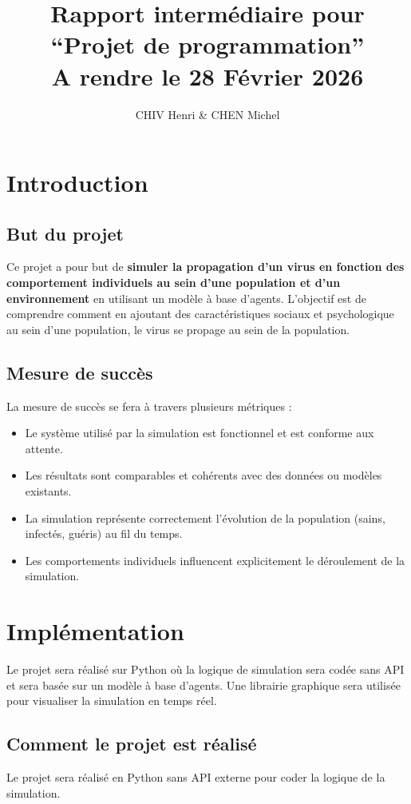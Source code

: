 \documentclass{article}
\title{%
  Rapport intermédiaire pour ``Projet de programmation''\\
  A rendre le 28 Février 2026%
}
\author{CHIV Henri \& CHEN Michel}
\begin{document}
\maketitle

\section{Introduction}

\subsection{But du projet}
Ce projet a pour but de \textbf{simuler la propagation d'un virus en fonction des comportement individuels au sein d'une population et d'un environnement} en utilisant un modèle à base d'agents.
L'objectif est de comprendre comment en ajoutant des caractéristiques sociaux et psychologique au sein d'une population, le virus se propage au sein de la population.

\subsection{Mesure de succès}
La mesure de succès se fera à travers plusieurs métriques :
\begin{itemize}
    \item Le système utilisé par la simulation est fonctionnel et est conforme aux attente.
    \item Les résultats sont comparables et cohérents avec des données ou modèles existants.
    \item La simulation représente correctement l'évolution de la population (sains, infectés, guéris) au fil du temps.
    \item Les comportements individuels influencent explicitement le déroulement de la simulation.
\end{itemize}

\section{Implémentation}
Le projet sera réalisé sur Python où la logique de simulation sera codée sans API et sera basée sur un modèle à base d'agents. Une librairie graphique sera utilisée pour visualiser la simulation en temps réel.

\subsection{Comment le projet est réalisé}
Le projet sera réalisé en Python sans API externe pour coder la logique de la simulation.
\end{document}
